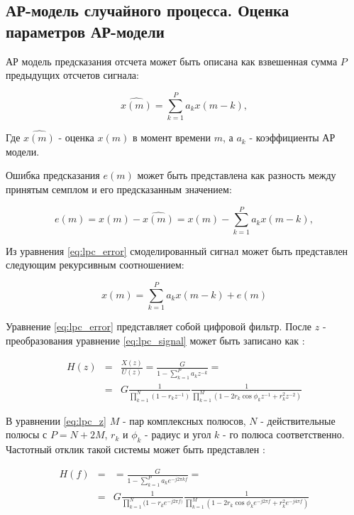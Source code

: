 \subsection{АР-модель случайного процесса. Оценка параметров АР-модели}

АР модель предсказания отсчета может быть описана как взвешенная сумма ${P}$ предыдущих отсчетов сигнала:
\begin{center}
\begin{equation}
	\label{eq:lpc_forecast}
	\hat{x(m)} = \sum \limits_{k=1}^P a_k x(m-k),
\end{equation}
\end{center}
Где ${\hat{x(m)}}$ - оценка ${x(m)}$ в момент времени ${m}$, а ${a_k}$ - коэффициенты АР модели.

Ошибка предсказания ${e(m)}$ может быть представлена как разность между принятым семплом и его
предсказанным значением:
\begin{center}
\begin{equation}
	\label{eq:lpc_error}
	e(m) = x(m) - \hat{x(m)} = x(m) - \sum \limits_{k=1}^P a_k x(m-k),
\end{equation}
\end{center}

Из уравнения \ref{eq:lpc_error} смоделированный сигнал может быть представлен следующим рекурсивным соотношением:
\begin{center}
\begin{equation}
	\label{eq:lpc_signal}
	x(m) = \sum \limits_{k=1}^P a_k x(m-k) + e(m)
\end{equation}
\end{center}

Уравнение \ref{eq:lpc_error} представляет собой цифровой фильтр.
После ${z}$ - преобразования уравнение \ref{eq:lpc_signal} может быть записано как \cite{saeed_book}:
\begin{center}
\begin{eqnarray}
	\label{eq:lpc_z}
		H(z)	& = & \frac{X(z)}{U(z)} = \frac{G}{1 - \sum \limits_{k=1}^P a_kz^{-k}} =  \nonumber \\
			& = & G\frac{1}{\prod \limits_{k=1}^N (1-r_kz^{-1})} \frac{1}{\prod \limits_{k=1}^M (1-2r_k \cos \phi_k z^{-1} + r_k^2z^{-2})}
\end{eqnarray}
\end{center}

В уравнении \ref{eq:lpc_z} ${M}$ - пар комплексных полюсов, ${N}$ - действительные полюсы с ${P=N+2M}$,
${r_k}$ и ${\phi_k}$ - радиус и угол ${k}$ - го полюса соответственно. Частотный отклик такой системы 
может быть представлен \cite{saeed_book}:
\begin{center}
\begin{eqnarray}
	\label{eq:lpc_freq_resp}
		H(f)	& = & = \frac{G}{1 - \sum \limits_{k=1}^P a_k e^{-j2 \pi kf}} =  \nonumber \\
			& = & G\frac{1}{\prod \limits_{k=1}^N (1-r_k e^{-j2 \pi f)}} \frac{1}{\prod \limits_{k=1}^M (1-2r_k \cos \phi_k e^{-j2 \pi f} + r_k^2 e^{-j4 \pi f})}
\end{eqnarray}
\end{center}

